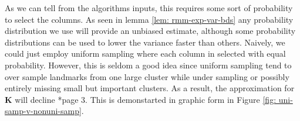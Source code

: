As we can tell from the algorithms inputs, this requires some sort of probability to select the columns. As seen in lemma \ref{lem: rmm-exp-var-bds} any probability distribution we use will provide an unbiased estimate, although some probability distributions can be used to lower the variance faster than others. Naively, we could just employ uniform sampling where each column in selected with equal probability. However, this is seldom a good idea since uniform sampling tend to over sample landmarks from one large cluster while under sampling or possibly entirely missing small but important clusters. As a result, the approximation for $\bm{K}$ will decline \cite{musco2017recursive}*{page 3}. This is demonstarted in graphic form in Figure \ref{fig: uni-samp-v-nonuni-samp}.
\begin{figure}[h]
    \centering
     \qquad
\end{figure}
